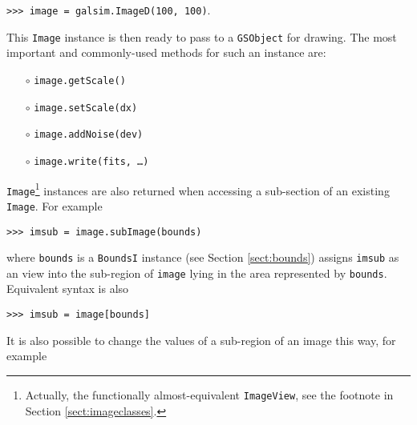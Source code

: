 \documentclass[preprint,11pt]{../../devel/modules/aastex}
\begin{document}
{\tt >>> image = galsim.ImageD(100, 100)}.

This \texttt{Image} instance is then ready to pass to a
\texttt{GSObject} for drawing.  The most important and commonly-used
methods for such an instance are:
\begin{itemize}

\item[$\circ$] \texttt{image.getScale()} 

\item[$\circ$] \texttt{image.setScale(dx)} 

\item[$\circ$] \texttt{image.addNoise(dev)} 

\item[$\circ$] \texttt{image.write(fits, \dots)}  

\end{itemize}

\texttt{Image}\footnote{Actually, the functionally almost-equivalent
  \texttt{ImageView}, see the footnote in Section
  \ref{sect:imageclasses}.}  instances are also returned when
accessing a sub-section of an existing \texttt{Image}.  For example

{\tt >>> imsub = image.subImage(bounds)}

where \texttt{bounds} is a \texttt{BoundsI} instance (see Section
\ref{sect:bounds}) assigns \texttt{imsub} as an view into
the sub-region of \texttt{image} lying in the area represented by
\texttt{bounds}.  Equivalent syntax is also

{\tt >>> imsub = image[bounds]}

It is also possible to change the values of a sub-region of an image
this way, for example
\end{document}
